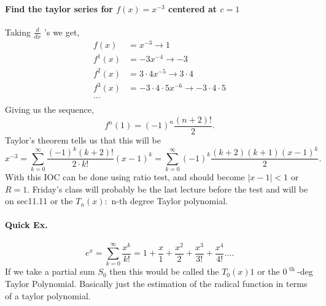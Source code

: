 \paragraph{Find the taylor series for $ f\left( x \right) =x^{ -3 } $ centered at $ c=1 $}
Taking $ \frac{ d }{ dx }  $ 's we get,
\begin{align*}
	f\left( x \right) &= x^{ -3 } \to 1\\
	f^{ 1 }\left( x \right) &= -3x^{ -4 } \to -3 \\
	f^{ 2 }\left( x \right) &= 3\cdot 4 x^{ -5 } \to 3\cdot 4\\
	f^{ 3 }\left( x \right) &= -3\cdot 4\cdot 5 x^{ -6 } \to -3\cdot 4\cdot 5\\
	\ldots \\
\end{align*}
Giving us the sequence,
\[
f^{ n }\left( 1 \right) =\left( -1 \right) ^{ n }\frac{ \left( n+2 \right) ! }{ 2 }
.\] 
Taylor's theorem tells us that this will be
\[
x^{ -3 }= \sum_{k=0}^{\infty} \frac{ \left( -1 \right) ^{ k }\left( k+2 \right) ! }{ 2\cdot k! }\left( x-1 \right) ^{ k } = \sum_{ k=0 } ^{ \infty } \left( -1 \right) ^{ k } \frac{ \left( k+2 \right) \left( k+1 \right) \left( x-1 \right) ^{ k } }{ 2 }
.\] 
With this IOC can be done using ratio test, and should become $ \left| x -1 \right| < 1 $ or $ R=1 $. 
Friday's class will probably be the last lecture before the test and will be on sec11.11 or the $ T_n\left( x \right) : $ n-th degree Taylor polynomial. 
\paragraph{Quick Ex.}
\[
e^{ x }=\sum_{ k=0 } ^{ \infty } \frac{ x^{ k } }{ k! }= 1 + \frac{ x }{ 1 } +\frac{ x^2 }{ 2 } + \frac{ x^3 }{ 3! }+ \frac{ x^{ 4 } }{ 4! }\ldots
.\] 
If we take a partial sum $ S_0 $ then this would be called the $ T_0\left( x \right) 1 $ or the $ 0^{ \text{ th } } $-deg Taylor Polynomial. Basically just the estimation of the radical function in terms of a taylor polynomial. 
